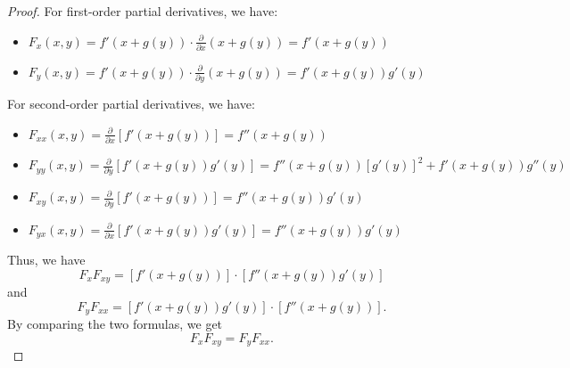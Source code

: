 \begin{proof}
    For first-order partial derivatives, we have:
    \begin{itemize}
        \item $F_x(x,y) = f'(x+g(y)) \cdot \frac{\partial}{\partial x}(x+g(y)) = f'(x+g(y))$
        \item $F_y(x,y) = f'(x+g(y)) \cdot \frac{\partial}{\partial y}(x+g(y)) = f'(x+g(y))g'(y)$
    \end{itemize}
    For second-order partial derivatives, we have:
    \begin{itemize}
        \item $F_{xx}(x,y) = \frac{\partial}{\partial x}[f'(x+g(y))] = f''(x+g(y))$
        \item $F_{yy}(x,y) = \frac{\partial}{\partial y}[f'(x+g(y))g'(y)] = f''(x+g(y))[g'(y)]^2 + f'(x+g(y))g''(y)$
        \item $F_{xy}(x,y) = \frac{\partial}{\partial y}[f'(x+g(y))] = f''(x+g(y))g'(y)$
        \item $F_{yx}(x,y) = \frac{\partial}{\partial x}[f'(x+g(y))g'(y)] = f''(x+g(y))g'(y)$
    \end{itemize}
    Thus, we have
    \[
    F_x F_{xy} = [f'(x+g(y))] \cdot [f''(x+g(y))g'(y)]
    \]
    and
    \[
    F_y F_{xx} = [f'(x+g(y))g'(y)] \cdot [f''(x+g(y))].
    \]
    By comparing the two formulas, we get
    \[
    F_x F_{xy} = F_y F_{xx}.
    \]
\end{proof}